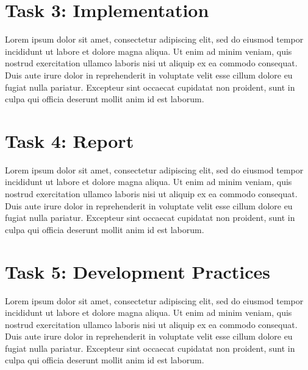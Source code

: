 \documentclass[titlepage]{article}
\begin{document}

\section*{Task 3: Implementation}
Lorem ipsum dolor sit amet, consectetur adipiscing elit, sed do eiusmod tempor incididunt ut labore et dolore magna aliqua. Ut enim ad minim veniam, quis nostrud exercitation ullamco laboris nisi ut aliquip ex ea commodo consequat. Duis aute irure dolor in reprehenderit in voluptate velit esse cillum dolore eu fugiat nulla pariatur. Excepteur sint occaecat cupidatat non proident, sunt in culpa qui officia deserunt mollit anim id est laborum.



\section*{Task 4: Report}
Lorem ipsum dolor sit amet, consectetur adipiscing elit, sed do eiusmod tempor incididunt ut labore et dolore magna aliqua. Ut enim ad minim veniam, quis nostrud exercitation ullamco laboris nisi ut aliquip ex ea commodo consequat. Duis aute irure dolor in reprehenderit in voluptate velit esse cillum dolore eu fugiat nulla pariatur. Excepteur sint occaecat cupidatat non proident, sunt in culpa qui officia deserunt mollit anim id est laborum.



\section*{Task 5: Development Practices}
Lorem ipsum dolor sit amet, consectetur adipiscing elit, sed do eiusmod tempor incididunt ut labore et dolore magna aliqua. Ut enim ad minim veniam, quis nostrud exercitation ullamco laboris nisi ut aliquip ex ea commodo consequat. Duis aute irure dolor in reprehenderit in voluptate velit esse cillum dolore eu fugiat nulla pariatur. Excepteur sint occaecat cupidatat non proident, sunt in culpa qui officia deserunt mollit anim id est laborum.
\newpage
\end{document}
